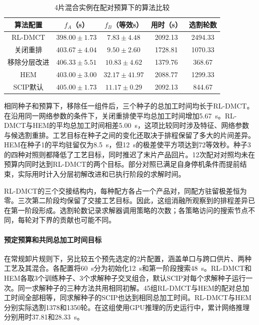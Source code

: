 \documentclass[final,5p,times,twocolumn]{elsarticle}
\begin{document}
\begin{table}[!htbp]\centering\small
\caption{4片混合实例在配对预算下的算法比较}
\label{tab:mixed-ablation-cn}
\setlength{\tabcolsep}{2.3pt}
\begin{tabular}{@{}*{5}{c}@{}}\toprule
算法配置 & $f_A$（s） & $f_B$（等效s） & 用时（s） & 选割轮数\\\midrule
RL-DMCT & $398.00\pm1.73$ & $7.83\pm4.48$ & 2092.13 & 2494.33\\
关闭重排 & $403.67\pm4.04$ & $9.50\pm2.60$ & 1728.81 & 1070.33\\
移除分层改进 & $406.33\pm5.51$ & $10.83\pm4.62$ & 1379.76 & 368.67\\\midrule
HEM & $403.00\pm3.00$ & $32.17\pm41.97$ & 2088.77 & 1299.33\\
SCIP默认 & $405.00\pm1.73$ & $11.17\pm0.29$ & 2092.13 & 844.67\\
\bottomrule\end{tabular}
\end{table}

相同种子和预算下，移除任一组件后，三个种子的总加工时间均长于RL-DMCT。在沿用同一网络参数的条件下，关闭重排使平均总加工时间增加5.67~s。RL-DMCT与HEM的平均总加工时间相差5.00~s，这项比较同时涉及特征、网络参数与候选割重排。工艺目标在种子之间的变化还取决于排程保留了多大的片间差异。HEM在种子1的平均驻留仅为8.5~s，但12~s的极差使平方项达到72等效秒。种子3的四种对照则都降低了工艺目标，同时推迟了末片产品回片。12次配对对照均未在预算内同时达到RL-DMCT的两个目标。部分对照已满足自身停机条件而提前结束，实际用时计入分层初解改进和已执行阶段的求解时间。

RL-DMCT的三个交接结构内，每种配方各占一个产品对，同配方驻留极差恒为零。三次第二阶段均保留了交接工艺目标。因此，这组消融所观察到的排程差异已在第一阶段形成。选割轮数记录求解器调用策略的次数；各策略访问的搜索节点不同，每轮对下界的贡献也可能不同。

\paragraph{预定预算和共同总加工时间目标}
在常规卸片规则下，另比较五个预先选定的2片配置，涵盖单口与跨口供片、两种工艺及其混合。各配置将60~s分为初始化12~s和第一阶段搜索48~s。RL-DMCT和HEM各取3个训练种子、3个求解种子交叉组合，默认SCIP对每个求解种子运行一次。同一求解种子的三种方法共用相同初解。45组RL-DMCT与HEM的配对总加工时间全部相等，同求解种子的SCIP也达到相同总加工时间。RL-DMCT与HEM分别实际选割1378和1350轮。在这组使用GPU推理的历史运行中，累计网络推理分别用时37.81和28.33~s。
\end{document}
